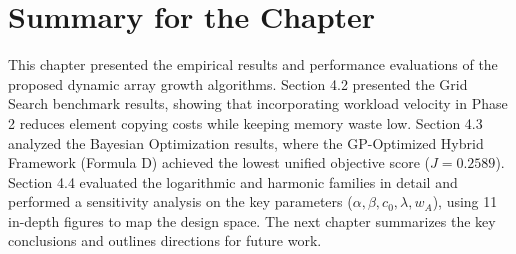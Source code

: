 \section{Summary for the Chapter}
This chapter presented the empirical results and performance evaluations of the 
proposed dynamic array growth algorithms. Section 4.2 presented the Grid Search 
benchmark results, showing that incorporating workload velocity in Phase 2 reduces 
element copying costs while keeping memory waste low. Section 4.3 analyzed the 
Bayesian Optimization results, where the GP-Optimized Hybrid Framework (Formula D) 
achieved the lowest unified objective score ($J=0.2589$). Section 4.4 evaluated 
the logarithmic and harmonic families in detail and performed a sensitivity 
analysis on the key parameters ($\alpha, \beta, c_0, \lambda, w_A$), using 11 
in-depth figures to map the design space. The next chapter summarizes the key 
conclusions and outlines directions for future work.
